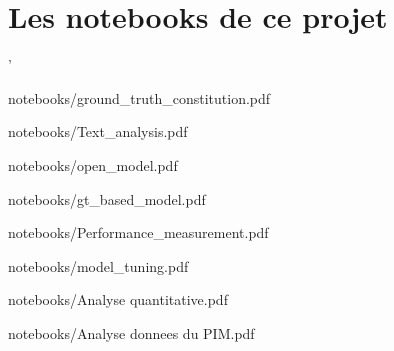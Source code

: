 \documentclass{report}
\begin{document}
\chapter{Les notebooks de ce projet}

'
        
        {notebooks/ground_truth_constitution.pdf}

        
        {notebooks/Text_analysis.pdf}

        
        {notebooks/open_model.pdf}
 
        
        {notebooks/gt_based_model.pdf}

        
        {notebooks/Performance_measurement.pdf}        

        
        {notebooks/model_tuning.pdf}              

        
                    {notebooks/Analyse quantitative.pdf}
        
        
                    {notebooks/Analyse donnees du PIM.pdf}
\end{document}
